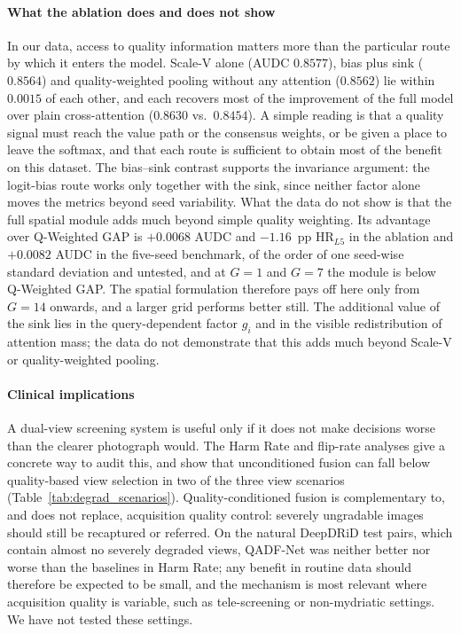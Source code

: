 \documentclass[final,5p,times,twocolumn,authoryear]{elsarticle}
\newcommand{\qadfnet}{QADF-Net}
\theoremstyle{plain}
\theoremstyle{remark}
\begin{document}
\paragraph{What the ablation does and does not show} In our data, access to quality information matters more than the particular route by which it enters the model. Scale-V alone (AUDC $0.8577$), bias plus sink ($0.8564$) and quality-weighted pooling without any attention ($0.8562$) lie within $0.0015$ of each other, and each recovers most of the improvement of the full model over plain cross-attention ($0.8630$ vs.\ $0.8454$). A simple reading is that a quality signal must reach the value path or the consensus weights, or be given a place to leave the softmax, and that each route is sufficient to obtain most of the benefit on this dataset. The bias--sink contrast supports the invariance argument: the logit-bias route works only together with the sink, since neither factor alone moves the metrics beyond seed variability. What the data do not show is that the full spatial module adds much beyond simple quality weighting. Its advantage over Q-Weighted GAP is $+0.0068$ AUDC and $-1.16$~pp $\text{HR}_{L5}$ in the ablation and $+0.0082$ AUDC in the five-seed benchmark, of the order of one seed-wise standard deviation and untested, and at $G=1$ and $G=7$ the module is below Q-Weighted GAP. The spatial formulation therefore pays off here only from $G=14$ onwards, and a larger grid performs better still. The additional value of the sink lies in the query-dependent factor $g_i$ and in the visible redistribution of attention mass; the data do not demonstrate that this adds much beyond Scale-V or quality-weighted pooling.

\paragraph{Clinical implications} A dual-view screening system is useful only if it does not make decisions worse than the clearer photograph would. The Harm Rate and flip-rate analyses give a concrete way to audit this, and show that unconditioned fusion can fall below quality-based view selection in two of the three view scenarios (Table~\ref{tab:degrad_scenarios}). Quality-conditioned fusion is complementary to, and does not replace, acquisition quality control: severely ungradable images should still be recaptured or referred. On the natural DeepDRiD test pairs, which contain almost no severely degraded views, \qadfnet{} was neither better nor worse than the baselines in Harm Rate; any benefit in routine data should therefore be expected to be small, and the mechanism is most relevant where acquisition quality is variable, such as tele-screening or non-mydriatic settings. We have not tested these settings.
\end{document}
